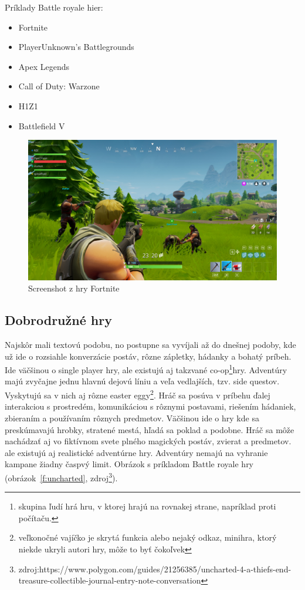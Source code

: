 \documentclass[10pt,oneside,slovak,a4paper]{article}
\begin{document}
Príklady Battle royale hier:
\begin{itemize}
\item Fortnite
\item PlayerUnknown's Battlegrounds
\item Apex Legends
\item Call of Duty: Warzone
\item H1Z1
\item Battlefield V
\end{itemize}

\begin{figure}[tbh]
\centering
\includegraphics[scale=0.15]{fortnite.jpg}
\caption{Screenshot z hry Fortnite}
\label{f:fortnite}
\end{figure}

\subsection{Dobrodružné hry} \label{zanre:adventure}

Najskôr mali textovú podobu, no postupne sa vyvíjali až do dnešnej podoby, kde už ide o rozsiahle konverzácie postáv, rôzne zápletky, hádanky a bohatý príbeh. Ide väčšinou o single player hry, ale existujú aj takzvané co-op\footnote{skupina ľudí hrá hru, v ktorej hrajú na rovnakej strane, napríklad proti počítaču.}hry. Adventúry majú zvyčajne jednu hlavnú dejovú líniu a veľa vedlajších, tzv. side questov. Vyskytujú sa v nich aj rôzne easter eggy\footnote{veľkonočné vajíčko je skrytá funkcia alebo nejaký odkaz, minihra, ktorý niekde ukryli autori hry, môže to byť čokoľvek }. Hráč sa posúva v príbehu ďalej interakciou s prostredém, komunikáciou s rôznymi postavami, riešením hádaniek, zbieraním a používaním rôznych predmetov. Väčšinou ide o hry kde sa preskúmavajú hrobky, stratené mestá, hľadá sa poklad a podobne. Hráč sa môže nachádzať aj vo fiktívnom svete plného magických postáv, zvierat a predmetov. ale existujú aj realistické adventúrne hry. Adventúry nemajú na vyhranie kampane žiadny časpvý limit. Obrázok s príkladom Battle royale hry (obrázok~\ref{f:uncharted}, zdroj\footnote{zdroj:https://www.polygon.com/guides/21256385/uncharted-4-a-thiefs-end-treasure-collectible-journal-entry-note-conversation}).
\end{document}
